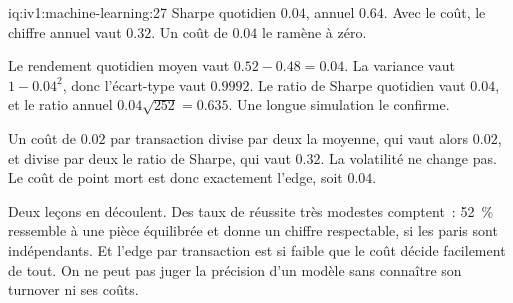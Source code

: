 \begin{solution}{iq:iv1:machine-learning:27}
Sharpe quotidien $0.04$, annuel $0.64$. Avec le coût, le chiffre annuel vaut $0.32$. Un coût de $0.04$ le ramène à zéro.

Le rendement quotidien moyen vaut $0.52 - 0.48 = 0.04$. La variance vaut $1 - 0.04^2$, donc l'écart-type vaut $0.9992$. Le ratio de Sharpe quotidien vaut $0.04$, et le ratio annuel $0.04\sqrt{252} = 0.635$. Une longue simulation le confirme.

Un coût de $0.02$ par transaction divise par deux la moyenne, qui vaut alors $0.02$, et divise par deux le ratio de Sharpe, qui vaut $0.32$. La volatilité ne change pas. Le coût de point mort est donc exactement l'edge, soit $0.04$.

Deux leçons en découlent. Des taux de réussite très modestes comptent~: 52~\% ressemble à une pièce équilibrée et donne un chiffre respectable, si les paris sont indépendants. Et l'edge par transaction est si faible que le coût décide facilement de tout. On ne peut pas juger la précision d'un modèle sans connaître son turnover ni ses coûts.



\end{solution}

